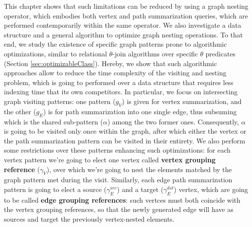 This chapter shows that such limitations can be reduced by using a graph nesting operator, which embodies both vertex and path summarization queries, which are performed contemporarily within the same operator. %
We also investigate a data structure and a general algorithm to optimize graph nesting operations. To that end, we study the existence of specific graph patterns prone to algorithmic optimizations, similar to relational $\theta$-join algorithms over specific $\theta$ predicates (Section \ref{sec:optimizableClass}). Hereby, we show that such algorithmic approaches allow to reduce the time complexity of the visiting and nesting problem, which is going to performed over a data structure that requires less indexing time that its own competitors. In particular, we focus on intersecting graph visiting patterns: one pattern ($g_V$) is given for vertex summarization, and the other ($g_E$) is for path summarization into one single edge, thus subsuming which is the shared sub-pattern ($\alpha$) among the two former ones. Consequently, $\alpha$ is going to be visited only once within the graph, after which either the vertex or the path summarization pattern can be visited in their entirety. We also perform some restrictions over these patterns enhancing such optimizations: for each vertex pattern we're going to elect one vertex called \textbf{vertex grouping reference} ($\gamma_V$), over which we're going to nest the elements matched by the graph pattern met during the visit. Similarly, each edge path summarization pattern is going to elect a source ($\gamma_E^{src}$) and a target ($\gamma_E^{dst}$) vertex, which are going to be called \textbf{edge grouping references}: such vertces must both coincide with the vertex grouping references, so that the newly generated edge will have as sources and target the previously vertex-nested elements. 


